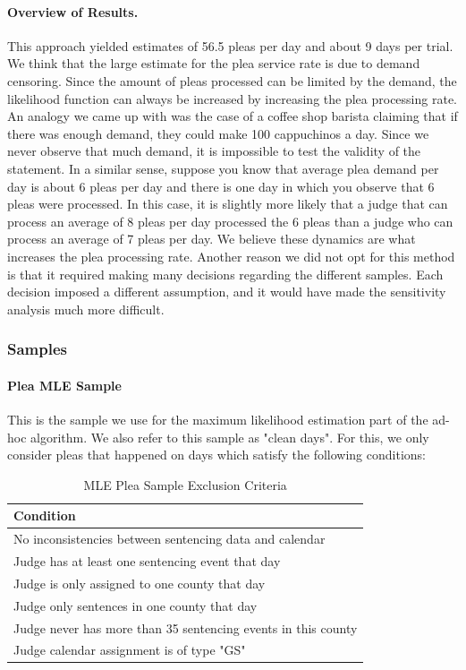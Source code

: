 \documentclass[11pt, oneside]{article}   	%
\theoremstyle{ModifiedStyle}
\begin{document}
		\paragraph{Overview of Results.} This approach yielded estimates of 56.5 pleas per day and about 9 days per trial. We think that the large estimate for the plea service rate is due to demand censoring. Since the amount of pleas processed can be limited by the demand, the likelihood function can always be increased by increasing the plea processing rate. An analogy we came up with was the case of a coffee shop barista claiming that if there was enough demand, they could make 100 cappuchinos a day. Since we never observe that much demand, it is impossible to test the validity of the statement. In a similar sense, suppose you know that average plea demand per day is about 6 pleas per day and there is one day in which you observe that 6 pleas were processed. In this case, it is slightly more likely that a judge that can process an average of 8 pleas per day processed the 6 pleas than a judge who can process an average of 7 pleas per day. We believe these dynamics are what increases the plea processing rate. Another reason we did not opt for this method is that it required making many decisions regarding the different samples. Each decision imposed a different assumption, and it would have made the sensitivity analysis much more difficult.

		\subsubsection{Samples}
			\paragraph{Plea MLE Sample} This is the sample we use for the maximum likelihood estimation part of the ad-hoc algorithm. We also refer to this sample as "clean days". For this, we only consider pleas that happened on days which satisfy the following conditions:
				\begin{table}[H]
					\centering
					\caption{MLE Plea Sample Exclusion Criteria}
					\begin{tabular}{|l|}
					\hline
					\textbf{Condition}                                                  \\ \hline
					No inconsistencies between sentencing data and calendar \\ \hline
					Judge has at least one sentencing event that day         \\ \hline
					Judge is only assigned to one county that day          \\ \hline
					Judge only sentences in one county that day             \\ \hline
					Judge never has more than 35 sentencing events in this county \\ \hline
					Judge calendar assignment is of type "GS"           \\ \hline
					\end{tabular}
				\end{table}
\end{document}
